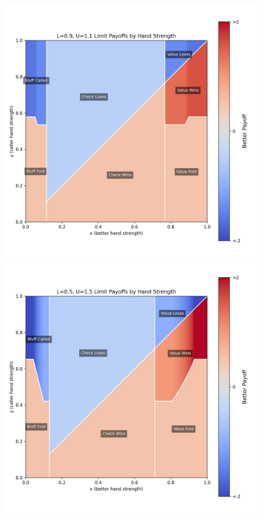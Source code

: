 \documentclass[../../main/main.tex]{subfiles}
\begin{document}
\begin{figure}[h!]
\begin{adjustwidth}{-1in}{-1in}
        \begin{minipage}{0.4\textwidth}
            \centering
            \includegraphics[width=\textwidth]{images/LU_payoffs_0.9_1.1.png}
        \end{minipage}
        \hspace{0.02\textwidth}
        \begin{minipage}{0.4\textwidth}
            \centering
            \includegraphics[width=\textwidth]{images/LU_payoffs_0.5_1.5.png}

\end{minipage}
\end{adjustwidth}
\end{figure}
\end{document}
